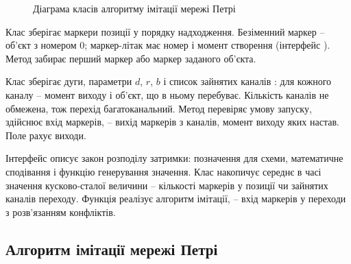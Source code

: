 \begin{figure}[H]
\caption{Діаграма класів алгоритму імітації мережі Петрі}
\label{fig:uml}
\end{figure}

Клас  зберігає маркери позиції у порядку надходження. Безіменний маркер -- об'єкт з номером 0; маркер-літак має номер і момент створення (інтерфейс ). Метод  забирає перший маркер або маркер заданого об'єкта.

Клас  зберігає дуги, параметри $d$, $r$, $b$ і список зайнятих каналів : для кожного каналу -- момент виходу і об'єкт, що в ньому перебуває. Кількість каналів не обмежена, тож перехід багатоканальний. Метод  перевіряє умову запуску,  здійснює вхід маркерів,  -- вихід маркерів з каналів, момент виходу яких настав. Поле  рахує виходи.

Інтерфейс  описує закон розподілу затримки: позначення для схеми, математичне сподівання і функцію генерування значення. Клас  накопичує середнє в часі значення кусково-сталої величини -- кількості маркерів у позиції чи зайнятих каналів переходу. Функція  реалізує алгоритм імітації,  -- вхід маркерів у переходи з розв'язанням конфліктів.

\subsection{Алгоритм імітації мережі Петрі}

